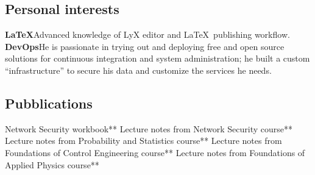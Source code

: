     \bigskip
    \subsection{Personal interests}
        {\textbf{LaTeX}}{Advanced knowledge of LyX editor and \LaTeX~publishing workflow.}
        {\textbf{DevOps}}{He is passionate in trying out and deploying free and open source solutions for continuous integration and system administration; he built a custom ``infrastructure'' to secure his data and customize the services he needs.}

    \bigskip
    \subsection{Pubblications}
        {Network Security workbook**}
        {Lecture notes from Network Security course**}
        {Lecture notes from Probability and Statistics course**}
        {Lecture notes from Foundations of Control Engineering course**}
        {Lecture notes from Foundations of Applied Physics course**}
